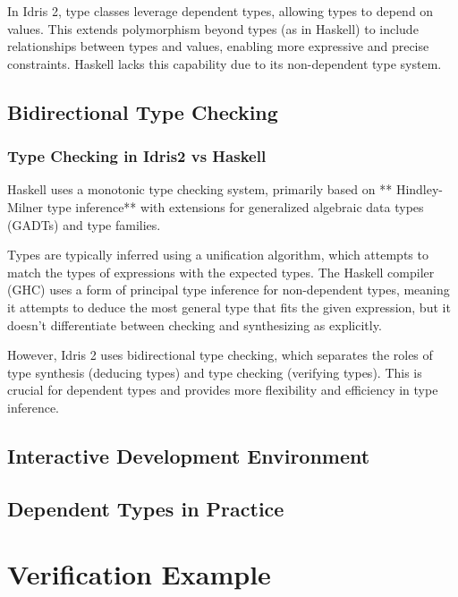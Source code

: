 \documentclass[]{rptuseminar}
\begin{document}
In Idris 2, type classes leverage dependent types, allowing types to depend on values. This extends polymorphism beyond types (as in Haskell) to include relationships between types and values, enabling more expressive and precise constraints. Haskell lacks this capability due to its non-dependent type system.


\subsection{Bidirectional Type Checking}
\subsubsection{Type Checking in Idris2 vs Haskell}
Haskell uses a monotonic type checking system, primarily based on ** Hindley-Milner type inference** with extensions for generalized algebraic data types (GADTs) and type families.

Types are typically inferred using a unification algorithm, which attempts to match the types of expressions with the expected types.
The Haskell compiler (GHC) uses a form of principal type inference for non-dependent types, meaning it attempts to deduce the most general type that fits the given expression, but it doesn't differentiate between checking and synthesizing as explicitly.

However, Idris 2 uses bidirectional type checking, which separates the roles of type synthesis (deducing types) and type checking (verifying types). This is crucial for dependent types and provides more flexibility and efficiency in type inference.

\subsection{Interactive Development Environment}  
\label{subsec:ide}  

\subsection{Dependent Types in Practice}  
\label{subsec:dependent-types}  

\section{Verification Example}  
\label{sec:verification-example}  
\end{document}
